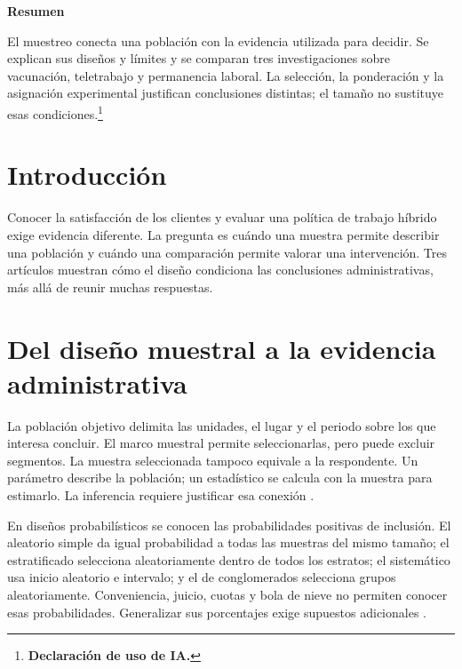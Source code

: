 \fontsize{12}{14.4}\selectfont{}\justifying
\begingroup
\noindent\textbf{Resumen}\par
El muestreo conecta una población con la evidencia utilizada para decidir. Se explican sus diseños y límites y se comparan tres investigaciones sobre vacunación, teletrabajo y permanencia laboral. La selección, la ponderación y la asignación experimental justifican conclusiones distintas; el tamaño no sustituye esas condiciones.\footnote{\textbf{Declaración de uso de IA.} \estadisticadeclaracionia}
\par\medskip
\renewcommand{\contentsname}{Tabla de contenido}\setcounter{tocdepth}{1}
\setlength{\cftbeforetoctitleskip}{3pt}\setlength{\cftaftertoctitleskip}{4pt}\setlength{\cftbeforesecskip}{1pt}
\renewcommand{\cfttoctitlefont}{\normalfont\fontsize{12}{15}\selectfont\bfseries}
\tableofcontents
\endgroup\medskip
\section{Introducción}
Conocer la satisfacción de los clientes y evaluar una política de trabajo híbrido exige evidencia diferente. La pregunta es cuándo una muestra permite describir una población y cuándo una comparación permite valorar una intervención. Tres artículos muestran cómo el diseño condiciona las conclusiones administrativas, más allá de reunir muchas respuestas.

\section{Del diseño muestral a la evidencia administrativa}
La población objetivo delimita las unidades, el lugar y el periodo sobre los que interesa concluir. El marco muestral permite seleccionarlas, pero puede excluir segmentos. La muestra seleccionada tampoco equivale a la respondente. Un parámetro describe la población; un estadístico se calcula con la muestra para estimarlo. La inferencia requiere justificar esa conexión \citep{holmesBusiness2023}.

En diseños probabilísticos se conocen las probabilidades positivas de inclusión. El aleatorio simple da igual probabilidad a todas las muestras del mismo tamaño; el estratificado selecciona aleatoriamente dentro de todos los estratos; el sistemático usa inicio aleatorio e intervalo; y el de conglomerados selecciona grupos aleatoriamente. Conveniencia, juicio, cuotas y bola de nieve no permiten conocer esas probabilidades. Generalizar sus porcentajes exige supuestos adicionales \citep{holmesBusiness2023,statcanNoProb2021}.

